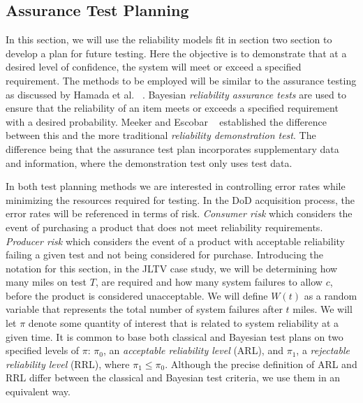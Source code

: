\documentclass[12pt]{article}
\begin{document}
\subsection{Assurance Test Planning}
In this section, we will use the reliability models fit in section two section
to develop a plan for future testing.  Here the objective is to demonstrate that
at a desired level of confidence, the system will meet or exceed a specified
requirement. The methods to be employed will be similar to the assurance testing
as discussed by Hamada et al. ~\cite{ref4}. Bayesian \emph{reliability assurance
tests} are used to ensure that the reliability of an item meets or exceeds a
specified requirement with a desired probability. Meeker and Escobar
~\cite{ME04} established the difference between this and the more traditional
\emph{reliability demonstration test}.  The difference being that the assurance
test plan incorporates supplementary data and information, where the
demonstration test only uses test data.

In both test planning methods we are interested in controlling error rates while
minimizing the resources required for testing.  In the DoD acquisition process,
the error rates will be referenced in terms of risk. \emph{Consumer risk} which
considers the event of purchasing a product that does not meet reliability
requirements.  \emph{Producer risk} which considers the event of a product with
acceptable reliability failing a given test and not being considered for
purchase.  Introducing the notation for this section, in the JLTV case study, we
will be determining how many miles on test $T$, are required and how many system
failures to allow $c$, before the product is considered unacceptable.  We will
define $W(t)$ as a random variable that represents the total number of system
failures after $t$ miles.  We will let $\pi$ denote some quantity of interest
that is related to system reliability at a given time. It is common to base both
classical and Bayesian test plans on two specified levels of $\pi$: $\pi_0$, an
\emph{acceptable reliability level} (ARL), and $\pi_1$, a \emph{rejectable
reliability level} (RRL), where $\pi_1 \leq  \pi_0$. Although the precise
definition of ARL and RRL differ between the classical and Bayesian test
criteria, we use them in an equivalent way.
\end{document}
